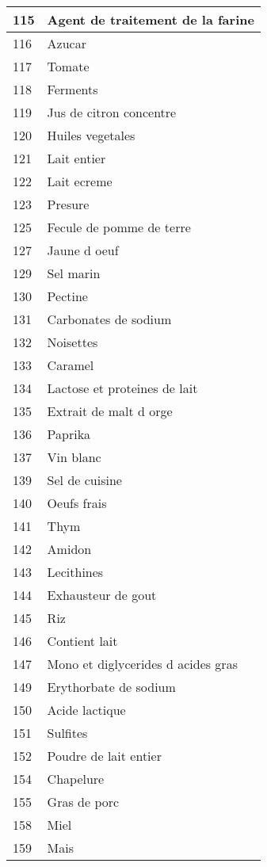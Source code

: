 \begin{longtable}{|l|l|}
115 & Agent de traitement de la farine \\ \hline 
116 & Azucar \\ \hline 
117 & Tomate \\ \hline 
118 & Ferments \\ \hline 
119 & Jus de citron concentre \\ \hline 
120 & Huiles vegetales \\ \hline 
121 & Lait entier \\ \hline 
122 & Lait ecreme \\ \hline 
123 & Presure \\ \hline 
125 & Fecule de pomme de terre \\ \hline 
127 & Jaune d oeuf \\ \hline 
129 & Sel marin \\ \hline 
130 & Pectine \\ \hline 
131 & Carbonates de sodium \\ \hline 
132 & Noisettes \\ \hline 
133 & Caramel \\ \hline 
134 & Lactose et proteines de lait \\ \hline 
135 & Extrait de malt d orge \\ \hline 
136 & Paprika \\ \hline 
137 & Vin blanc \\ \hline 
139 & Sel de cuisine \\ \hline 
140 & Oeufs frais \\ \hline 
141 & Thym \\ \hline 
142 & Amidon \\ \hline 
143 & Lecithines \\ \hline 
144 & Exhausteur de gout \\ \hline 
145 & Riz \\ \hline 
146 & Contient lait \\ \hline 
147 & Mono et diglycerides d acides gras \\ \hline 
149 & Erythorbate de sodium \\ \hline 
150 & Acide lactique \\ \hline 
151 & Sulfites \\ \hline 
152 & Poudre de lait entier \\ \hline 
154 & Chapelure \\ \hline 
155 & Gras de porc \\ \hline 
158 & Miel \\ \hline 
159 & Mais \\ \hline 

\end{longtable}
